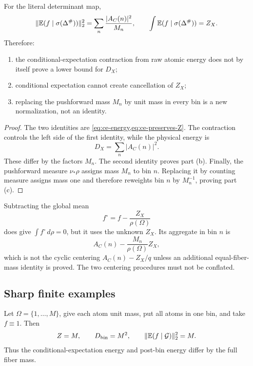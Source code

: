 \begin{proposition}
\label{prop:literal-ce}
For the literal determinant map,
\begin{equation}
 \|\mathbb E(f\mid\sigma(\Delta^\#))\|_2^2
 =\sum_n\frac{|A_C(n)|^2}{M_n},
 \qquad
 \int\mathbb E(f\mid\sigma(\Delta^\#))=Z_X.
 \label{eq:literal-ce}
\end{equation}
Therefore:
\begin{enumerate}[label=\textup{(\alph*)},leftmargin=2.3em]
 \item the conditional-expectation contraction from raw atomic
 energy does not by itself prove a lower bound for \(D_X\);
 \item conditional expectation cannot create cancellation of
 \(Z_X\);
 \item replacing the pushforward mass \(M_n\) by unit mass in every
 bin is a new normalization, not an identity.
\end{enumerate}
\end{proposition}

\begin{proof}
The two identities are
\cref{eq:ce-energy,eq:ce-preserves-Z}.  The contraction controls the
left side of the first identity, while the physical energy is
\[
 D_X=\sum_n|A_C(n)|^2.
\]
These differ by the factors \(M_n\).  The second identity proves
part (b).  Finally, the pushforward measure
\(\nu_\ast\rho\) assigns mass \(M_n\) to bin \(n\).  Replacing it by
counting measure assigns mass one and therefore reweights bin \(n\)
by \(M_n^{-1}\), proving part (c).
\end{proof}

\begin{remark}
Subtracting the global mean
\[
 f^\circ=f-\frac{Z_X}{\rho(\Omega)}
\]
does give \(\int f^\circ\,d\rho=0\), but it uses the unknown
\(Z_X\).  Its aggregate in bin \(n\) is
\[
 A_C(n)-\frac{M_n}{\rho(\Omega)}Z_X,
\]
which is not the cyclic centering
\(A_C(n)-Z_X/q\) unless an additional equal-fiber-mass identity is
proved.  The two centering procedures must not be conflated.
\end{remark}

\subsection{Sharp finite examples}

\begin{example}
\label{ex:ce-single-fiber}
Let \(\Omega=\{1,\ldots,M\}\), give each atom unit mass, put all atoms
in one bin, and take \(f\equiv1\).  Then
\[
 Z=M,\qquad D_{\rm bin}=M^2,\qquad
 \|\mathbb E(f\mid\mathcal G)\|_2^2=M.
\]
Thus the conditional-expectation energy and post-bin energy differ
by the full fiber mass.
\end{example}

